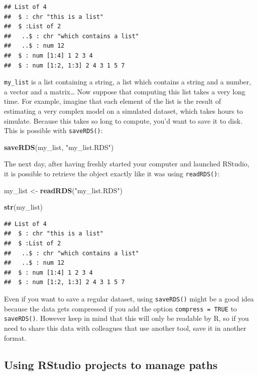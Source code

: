 \documentclass[]{gitbook}
\newenvironment{Shaded}{\begin{snugshade}}{\end{snugshade}}
\newcommand{\KeywordTok}[1]{\textcolor[rgb]{0.13,0.29,0.53}{\textbf{#1}}}
\newcommand{\NormalTok}[1]{#1}
\newcommand{\StringTok}[1]{\textcolor[rgb]{0.31,0.60,0.02}{#1}}
\theoremstyle{definition}
\theoremstyle{definition}
\theoremstyle{definition}
\theoremstyle{remark}
\begin{document}
\begin{verbatim}
## List of 4
##  $ : chr "this is a list"
##  $ :List of 2
##   ..$ : chr "which contains a list"
##   ..$ : num 12
##  $ : num [1:4] 1 2 3 4
##  $ : num [1:2, 1:3] 2 4 3 1 5 7
\end{verbatim}

\texttt{my\_list} is a list containing a string, a list which contains a
string and a number, a vector and a matrix\ldots{} Now suppose that
computing this list takes a very long time. For example, imagine that
each element of the list is the result of estimating a very complex
model on a simulated dataset, which takes hours to simulate. Because
this takes so long to compute, you'd want to save it to disk. This is
possible with \texttt{saveRDS()}:

\begin{Shaded}
\begin{Highlighting}[]
\KeywordTok{saveRDS}\NormalTok{(my_list, }\StringTok{"my_list.RDS"}\NormalTok{)}
\end{Highlighting}
\end{Shaded}

The next day, after having freshly started your computer and launched
RStudio, it is possible to retrieve the object exactly like it was using
\texttt{readRDS()}:

\begin{Shaded}
\begin{Highlighting}[]
\NormalTok{my_list <-}\StringTok{ }\KeywordTok{readRDS}\NormalTok{(}\StringTok{"my_list.RDS"}\NormalTok{)}

\KeywordTok{str}\NormalTok{(my_list)}
\end{Highlighting}
\end{Shaded}

\begin{verbatim}
## List of 4
##  $ : chr "this is a list"
##  $ :List of 2
##   ..$ : chr "which contains a list"
##   ..$ : num 12
##  $ : num [1:4] 1 2 3 4
##  $ : num [1:2, 1:3] 2 4 3 1 5 7
\end{verbatim}

Even if you want to save a regular dataset, using \texttt{saveRDS()}
might be a good idea because the data gets compressed if you add the
option \texttt{compress\ =\ TRUE} to \texttt{saveRDS()}. However keep in
mind that this will only be readable by R, so if you need to share this
data with colleagues that use another tool, save it in another format.

\hypertarget{using-rstudio-projects-to-manage-paths}{%
\subsection{Using RStudio projects to manage
paths}\label{using-rstudio-projects-to-manage-paths}}
\end{document}
